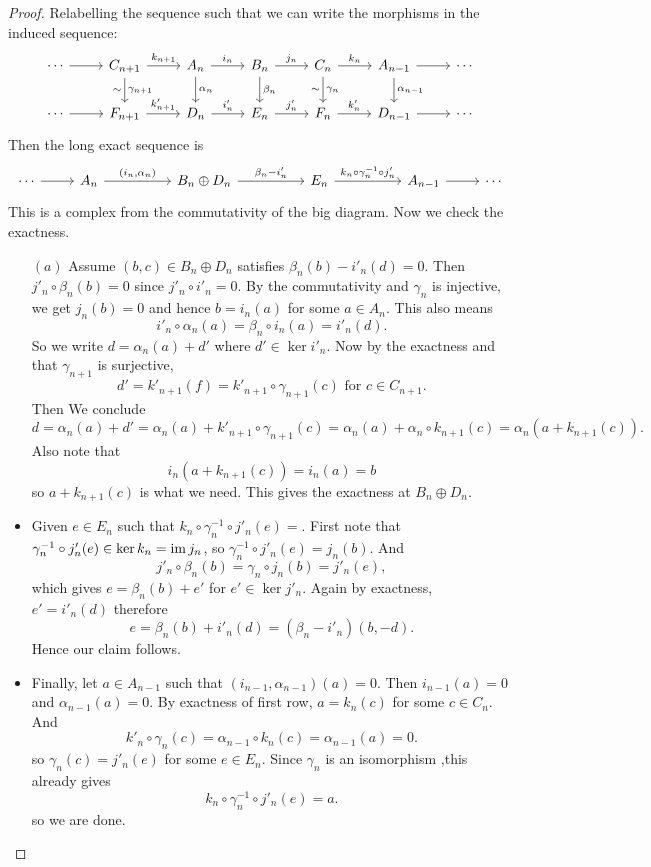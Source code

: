 \begin{proof}
Relabelling the sequence such that we can write the morphisms in the induced sequence:
\[\begin{tikzcd}
\cdots\ar[r]&C_{n+1}\ar[d,"\gamma_{n+1}","\sim"']\ar[r,"k_{n+1}"]&A_n\ar[d,"\alpha_n"]\ar[r,"i_n"]&B_n\ar[d,"\beta_n"]\ar[r,"j_n"]&C_n\ar[d,"\gamma_n","\sim"']\ar[r,"k_n"]&A_{n-1}\ar[d,"\alpha_{n-1}"]\ar[r]&\cdots\\
\cdots\ar[r]&F_{n+1}\ar[r,"k'_{n+1}"]&D_n\ar[r,"i'_n"]&E_n\ar[r,"j'_n"]&F_n\ar[r,"k'_n"]&D_{n-1}\ar[r]&\cdots
\end{tikzcd}\]
Then the long exact sequence is
\[\begin{tikzcd}
\cdots\ar[r]&A_n\ar[rr,"{(i_n,\alpha_n)}"]&&B_n\oplus D_n\ar[rr,"\beta_n-i'_n"]&&E_n\ar[rr,"k_n\circ\gamma_n^{-1}\circ j'_n"]&&A_{n-1}\ar[r]&\cdots
\end{tikzcd}\]
This is a complex from the commutativity of the big diagram. Now we check the exactness.
\begin{itemize}
\item[$(a)$]Assume $(b,c)\in B_n\oplus D_n$ satisfies $\beta_n(b)-i'_n(d)=0$. Then $j'_n\circ \beta_n(b)=0$ since $j'_n\circ i'_n=0$. By the commutativity and $\gamma_n$ is injective, we get $j_n(b)=0$ and hence $b=i_n(a)$ for some $a\in A_n$. This also means
\[i'_n\circ\alpha_n(a)=\beta_n\circ i_n(a)=i'_n(d).\]
So we write $d=\alpha_n(a)+d'$ where $d'\in\ker i'_n$. Now by the exactness and that $\gamma_{n+1}$ is surjective, \[d'=k'_{n+1}(f)=k'_{n+1}\circ\gamma_{n+1}(c)\text{ for }c\in C_{n+1}.\]
Then We conclude
\[d=\alpha_n(a)+d'=\alpha_n(a)+k'_{n+1}\circ\gamma_{n+1}(c)=\alpha_n(a)+\alpha_n\circ k_{n+1}(c)=\alpha_n(a+k_{n+1}(c)).\]
Also note that
\[i_n(a+k_{n+1}(c))=i_n(a)=b\]
so $a+k_{n+1}(c)$ is what we need. This gives the exactness at $B_n\oplus D_n$.
\item Given $e\in E_n$ such that $k_n\circ\gamma_n^{-1}\circ j'_n(e)=$. First note that $\gamma_n^{-1}\circ j'_n(e)\in\mathrm{ker}\, k_n=\mathrm{im}\, j_n$, so $\gamma_n^{-1}\circ j'_n(e)=j_n(b)$. And
\[j'_n\circ\beta_n(b)=\gamma_n\circ j_n(b)=j'_n(e),\]
which gives $e=\beta_n(b)+e'$ for $e'\in\ker j'_n$. Again by exactness, $e'=i'_n(d)$ therefore
\[e=\beta_n(b)+i'_n(d)=(\beta_n-i'_n)(b,-d).\]
Hence our claim follows.
\item Finally, let $a\in A_{n-1}$ such that $(i_{n-1},\alpha_{n-1})(a)=0$. Then $i_{n-1}(a)=0$ and $\alpha_{n-1}(a)=0$. By exactness of first row, $a=k_n(c)$ for some $c\in C_n$. And 
\[k'_n\circ\gamma_n(c)=\alpha_{n-1}\circ k_n(c)=\alpha_{n-1}(a)=0.\]
so $\gamma_n(c)=j'_n(e)$ for some $e\in E_n$. Since $\gamma_n$ is an isomorphism ,this already gives 
\[k_n\circ\gamma_n^{-1}\circ j'_n(e)=a.\]
so we are done.
\end{itemize}
\end{proof}
